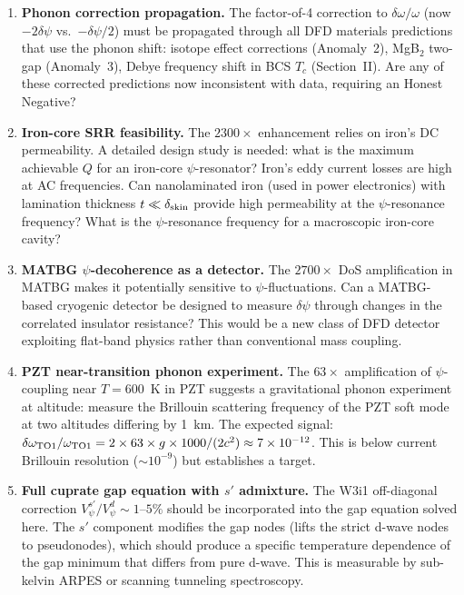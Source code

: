 \documentclass[11pt]{article}
\newcommand{\ee}[1]{\times 10^{#1}}
\begin{document}
\begin{enumerate}[leftmargin=*]

\item \textbf{Phonon correction propagation.} The factor-of-4 correction to
  $\delta\omega/\omega$ (now $-2\delta\psi$ vs.\ $-\delta\psi/2$) must be
  propagated through all DFD materials predictions that use the phonon shift:
  isotope effect corrections (Anomaly~2), MgB$_2$ two-gap (Anomaly~3), Debye
  frequency shift in BCS $T_c$ (Section~II). Are any of these corrected
  predictions now inconsistent with data, requiring an Honest Negative?

\item \textbf{Iron-core SRR feasibility.} The $2300\times$ enhancement relies
  on iron's DC permeability. A detailed design study is needed: what is the
  maximum achievable $Q$ for an iron-core $\psi$-resonator? Iron's eddy current
  losses are high at AC frequencies. Can nanolaminated iron (used in power
  electronics) with lamination thickness $t \ll \delta_{\rm skin}$ provide
  high permeability at the $\psi$-resonance frequency? What is the $\psi$-resonance
  frequency for a macroscopic iron-core cavity?

\item \textbf{MATBG $\psi$-decoherence as a detector.} The $2700\times$ DoS
  amplification in MATBG makes it potentially sensitive to $\psi$-fluctuations.
  Can a MATBG-based cryogenic detector be designed to measure $\delta\psi$
  through changes in the correlated insulator resistance? This would be a
  new class of DFD detector exploiting flat-band physics rather than
  conventional mass coupling.

\item \textbf{PZT near-transition phonon experiment.} The $63\times$ amplification
  of $\psi$-coupling near $T = 600$~K in PZT suggests a gravitational phonon
  experiment at altitude: measure the Brillouin scattering frequency of the
  PZT soft mode at two altitudes differing by 1~km.
  The expected signal: $\delta\omega_{\rm TO1}/\omega_{\rm TO1}
  = 2 \times 63 \times g \times 1000/(2c^2) \approx 7\ee{-12}$.
  This is below current Brillouin resolution ($\sim 10^{-9}$) but establishes
  a target.

\item \textbf{Full cuprate gap equation with $s'$ admixture.} The W3i1
  off-diagonal correction $V_\psi^{s'}/V_\psi^d \sim 1$--$5\%$ should be
  incorporated into the gap equation solved here. The $s'$ component modifies
  the gap nodes (lifts the strict d-wave nodes to pseudonodes), which should
  produce a specific temperature dependence of the gap minimum that differs
  from pure d-wave. This is measurable by sub-kelvin ARPES or scanning
  tunneling spectroscopy.


\end{enumerate}
\end{document}
